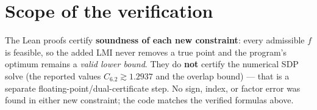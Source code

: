 \documentclass[11pt]{article}
\begin{document}
\section*{Scope of the verification}
The Lean proofs certify \textbf{soundness of each new constraint}: every
admissible $f$ is feasible, so the added LMI never removes a true point and the
program's optimum remains a \emph{valid lower bound}. They do \textbf{not}
certify the numerical SDP solve (the reported values
$C_{6.2}\gtrsim 1.2937$ and the overlap bound) — that is a separate
floating-point/dual-certificate step. No sign, index, or factor error was found
in either new constraint; the code matches the verified formulas above.
\end{document}
